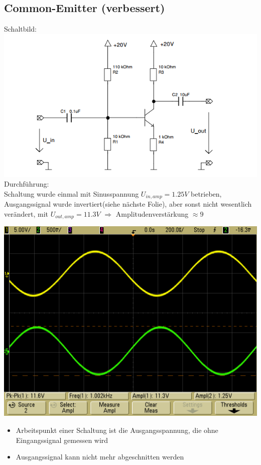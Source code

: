 \documentclass[compress,11pt]{beamer}
\begin{document}
\subsection{Common-Emitter (verbessert)}
\begin{frame}
Schaltbild:\\
\includegraphics[width=.7\textwidth]{schaltbilder/schalt_3b}\\
Durchführung:\\

Schaltung wurde einmal mit Sinusspannung $U_{in,amp} = 1.25 V$ betrieben, Ausgangssignal wurde invertiert(siehe nächste Folie), aber sonst nicht wesentlich verändert, mit $U_{out,amp} = 11.3 V$ $\Rightarrow$ Amplitudenverstärkung $\approx 9$

\end{frame}
\begin{frame}
\includegraphics[width=.7\textwidth]{../daten/oszi/scope_51}
\end{frame}
\begin{frame}
\begin{itemize}
\item Arbeitspunkt einer Schaltung ist die Ausgangsspannung, die ohne Eingangssignal gemessen wird
\item Ausgangssignal kann nicht mehr abgeschnitten werden
\end{itemize}
\end{frame}
\end{document}
